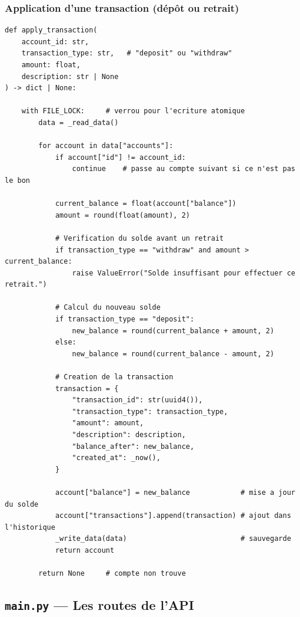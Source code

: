 \documentclass[12pt,a4paper]{article}
\begin{document}
\subsubsection{Application d'une transaction (dépôt ou retrait)}

\begin{lstlisting}[style=python, caption={storage.py — apply\_transaction()}]
def apply_transaction(
    account_id: str,
    transaction_type: str,   # "deposit" ou "withdraw"
    amount: float,
    description: str | None
) -> dict | None:

    with FILE_LOCK:     # verrou pour l'ecriture atomique
        data = _read_data()

        for account in data["accounts"]:
            if account["id"] != account_id:
                continue    # passe au compte suivant si ce n'est pas le bon

            current_balance = float(account["balance"])
            amount = round(float(amount), 2)

            # Verification du solde avant un retrait
            if transaction_type == "withdraw" and amount > current_balance:
                raise ValueError("Solde insuffisant pour effectuer ce retrait.")

            # Calcul du nouveau solde
            if transaction_type == "deposit":
                new_balance = round(current_balance + amount, 2)
            else:
                new_balance = round(current_balance - amount, 2)

            # Creation de la transaction
            transaction = {
                "transaction_id": str(uuid4()),
                "transaction_type": transaction_type,
                "amount": amount,
                "description": description,
                "balance_after": new_balance,
                "created_at": _now(),
            }

            account["balance"] = new_balance            # mise a jour du solde
            account["transactions"].append(transaction) # ajout dans l'historique
            _write_data(data)                           # sauvegarde
            return account

        return None     # compte non trouve
\end{lstlisting}

\subsection{\texttt{main.py} — Les routes de l'API}
\end{document}
